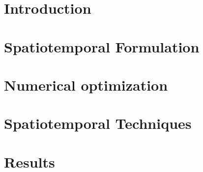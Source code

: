     \ifgatech               %
\begin{preliminary}

   \begin{acknowledgements}
     
   \end{acknowledgements}

   \contents


\end{preliminary}
    \fi



\ifboyscout \pagestyle{headings} \fi  %

\chapter{Introduction}
\label{c-intro}
%

\chapter{Spatiotemporal Formulation}
\label{c-formulation}


\chapter{Numerical optimization}
\label{c-optimization}


\chapter{Spatiotemporal Techniques}
\label{c-techniques}
%

\chapter{Results}
\label{c-results}
%


